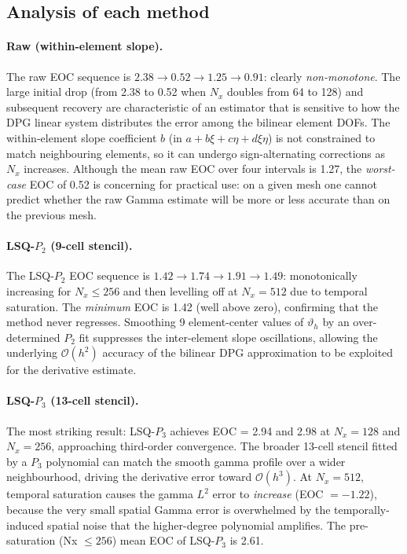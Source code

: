 \documentclass[11pt,a4paper]{article}
\newcommand{\Nx}{N_x}
\newcommand{\bigo}[1]{\mathcal{O}(#1)}
\newcommand{\vth}{\vartheta}
\begin{document}
\subsection{Analysis of each method}

\paragraph{Raw (within-element slope).}
The raw EOC sequence is $2.38 \to 0.52 \to 1.25 \to 0.91$: clearly
\emph{non-monotone}.  The large initial drop (from 2.38 to 0.52 when
$\Nx$ doubles from 64 to 128) and subsequent recovery are characteristic of
an estimator that is sensitive to how the DPG linear system distributes
the error among the bilinear element DOFs.  The within-element slope
coefficient $b$ (in $a + b\xi + c\eta + d\xi\eta$) is not constrained
to match neighbouring elements, so it can undergo sign-alternating
corrections as $\Nx$ increases.  Although the mean raw EOC over four
intervals is 1.27, the \emph{worst-case} EOC of 0.52 is concerning for
practical use: on a given mesh one cannot predict whether the raw Gamma
estimate will be more or less accurate than on the previous mesh.

\paragraph{LSQ-$P_2$ (9-cell stencil).}
The LSQ-$P_2$ EOC sequence is $1.42 \to 1.74 \to 1.91 \to 1.49$:
monotonically increasing for $\Nx \le 256$ and then levelling off at
$\Nx=512$ due to temporal saturation.  The \emph{minimum} EOC is 1.42
(well above zero), confirming that the method never regresses.
Smoothing 9 element-center values of $\vth_h$ by an over-determined
$P_2$ fit suppresses the inter-element slope oscillations, allowing the
underlying $\bigo{h^2}$ accuracy of the bilinear DPG approximation
to be exploited for the derivative estimate.

\paragraph{LSQ-$P_3$ (13-cell stencil).}
The most striking result: LSQ-$P_3$ achieves EOC = 2.94 and 2.98 at
$\Nx = 128$ and $\Nx = 256$, approaching third-order convergence.
The broader 13-cell stencil fitted by a $P_3$ polynomial can match the
smooth gamma profile over a wider neighbourhood, driving the derivative
error toward $\bigo{h^3}$.  At $\Nx = 512$, temporal saturation causes
the gamma $L^2$ error to \emph{increase} (EOC $= -1.22$), because the
very small spatial Gamma error is overwhelmed by the temporally-induced
spatial noise that the higher-degree polynomial amplifies.  The
pre-saturation (Nx $\le 256$) mean EOC of LSQ-$P_3$ is 2.61.
\end{document}
